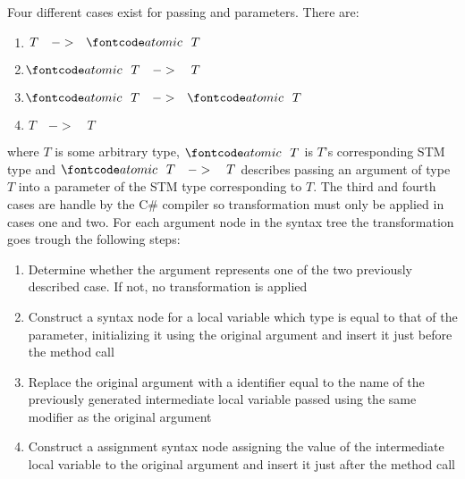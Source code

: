 Four different cases exist for passing  and  parameters. There are: 
\begin{enumerate}
	\item $T \quad -> \quad \bscode{atomic} \quad T$
	\item $\bscode{atomic} \quad T \quad -> \quad T$
	\item $\bscode{atomic} \quad T \quad->\quad \bscode{atomic} \quad T$
	\item $T \quad->\quad T$
\end{enumerate} 
where $T$ is some arbitrary type, $\text{ } \bscode{atomic} \quad  T$ is $T$'s corresponding \ac{STM} type and $\text{ } \bscode{atomic} \quad T \quad -> \quad T$ describes passing an argument of type $T$ into a parameter of the \ac{STM} type corresponding to $T$. The third and fourth cases are handle by the C\# compiler so transformation must only be applied in cases one and two.
For each argument node in the syntax tree the transformation goes trough the following steps:
\begin{enumerate}
	\item Determine whether the argument represents one of the two previously described case. If not, no transformation is applied
	\item Construct a syntax node for a local variable which type is equal to that of the parameter, initializing it using the original argument and insert it just before the method call
	\item Replace the original argument with a identifier equal to the name of the previously generated intermediate local variable passed using the same modifier as the original argument
	\item Construct a assignment syntax node assigning the value of the intermediate local variable to the original argument and insert it just after the method call
\end{enumerate}

